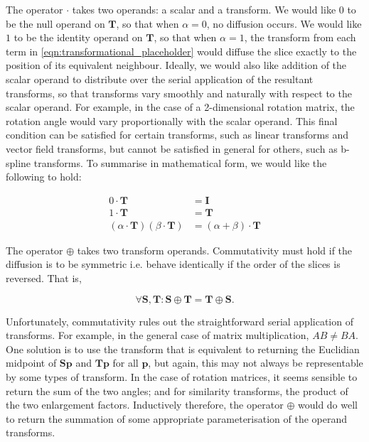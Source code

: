 		The operator $\cdot$ takes two operands: a scalar and a transform. We would like $0$ to be the null operand on $\mathbf{T}$, so that when $\alpha = 0$, no diffusion occurs. We would like $1$ to be the identity operand on $\mathbf{T}$, so that when $\alpha = 1$, the transform from each term in \ref{eqn:transformational_placeholder} would diffuse the slice exactly to the position of its equivalent neighbour. Ideally, we would also like addition of the scalar operand to distribute over the serial application of the resultant transforms, so that transforms vary smoothly and naturally with respect to the scalar operand. For example, in the case of a 2-dimensional rotation matrix, the rotation angle would vary proportionally with the scalar operand. This final condition can be satisfied for certain transforms, such as linear transforms and vector field transforms, but cannot be satisfied in general for others, such as b-spline transforms. To summarise in mathematical form, we would like the following to hold:
		
		\begin{align}
			0 \cdot \mathbf{T} &= \mathbf{I} \label{eqn:null} \\
			1 \cdot \mathbf{T} &= \mathbf{T} \label{eqn:identity} \\
			(\alpha \cdot \mathbf{T}) (\beta \cdot \mathbf{T}) &= (\alpha + \beta) \cdot \mathbf{T} \label{eqn:distributivity}
		\end{align}
	 	
	  The operator $\oplus$ takes two transform operands. Commutativity must hold if the diffusion is to be symmetric i.e. behave identically if the order of the slices is reversed. That is,
		
		\begin{equation}
			\forall \mathbf{S}, \mathbf{T} : \mathbf{S} \oplus \mathbf{T} = \mathbf{T} \oplus \mathbf{S}. \label{eqn:commutativity}
		\end{equation}
		
		Unfortunately, commutativity rules out the straightforward serial application of transforms. For example, in the general case of matrix multiplication, $AB \ne BA$. One solution is to use the transform that is equivalent to returning the Euclidian midpoint of $\mathbf{Sp}$ and $\mathbf{Tp}$ for all $\mathbf{p}$, but again, this may not always be representable by some types of transform. In the case of rotation matrices, it seems sensible to return the sum of the two angles; and for similarity transforms, the product of the two enlargement factors. Inductively therefore, the operator $\oplus$ would do well to return the summation of some appropriate parameterisation of the operand transforms.
		
